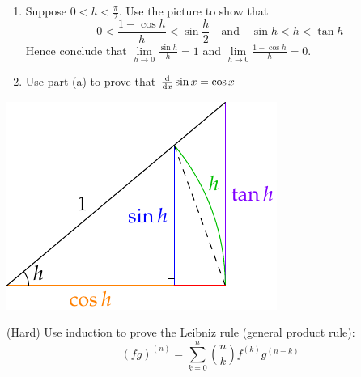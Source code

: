 \begin{exercises}{}
\begin{enumerate}
	\begin{minipage}[t]{0.63\linewidth}\vspace{0pt}
	  \item\label{ex:trigdiff}\begin{enumerate}
	    \item Suppose $0<h<\frac\pi 2$. Use the picture to show that
			\[0<\frac{1-\cos h}h< \sin\frac{h}2 \quad\text{and}\quad  \sin h< h<\tan h\]
			Hence conclude that $\lim\limits_{h\to 0}\frac{\sin h}h=1$ and $\lim\limits_{h\to 0}\frac{1-\cos h}h=0$.
		\item Use part (a) to prove that $\frac{\mathrm{d} }{\mathrm{d} x}\sin x=\cos x$
	\end{enumerate}
	\end{minipage}\begin{minipage}[t]{0.37\linewidth}\vspace{0pt}
  \flushright\includegraphics[scale=1]{trig-diff2}
  \end{minipage}
	
   \item (Hard) Use induction to prove the Leibniz rule (general product rule):
   \[(fg)^{(n)}=\sum_{k=0}^n\binom nkf^{(k)}g^{(n-k)}\]
\end{enumerate}
\end{exercises}

\clearpage

